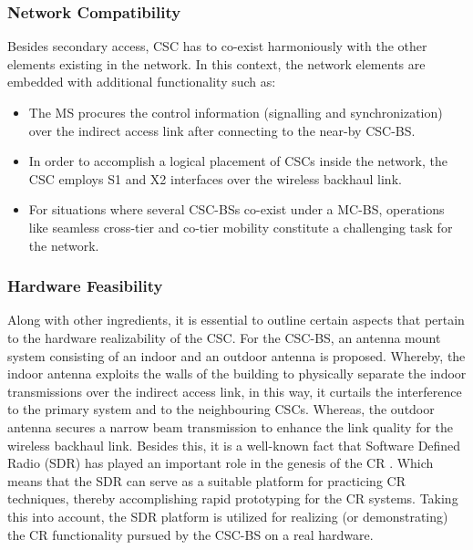 \subsubsection*{Network Compatibility}
Besides secondary access, CSC has to co-exist harmoniously with the other elements existing in the network. In this context, the network elements are embedded with additional functionality such as:
\begin{itemize}
\item The MS procures the control information (signalling and synchronization) over the indirect access link after connecting to the near-by CSC-BS.
\item In order to accomplish a logical placement of CSCs inside the network, the CSC employs S1 and X2 interfaces over the wireless backhaul link.
\item For situations where several CSC-BSs co-exist under a MC-BS, operations like seamless cross-tier and co-tier mobility constitute a challenging task for the network.
\end{itemize}


\subsubsection*{Hardware Feasibility}
Along with other ingredients, it is essential to outline certain aspects that pertain to the hardware realizability of the CSC. For the CSC-BS, an antenna mount system consisting of an indoor and an outdoor antenna is proposed. Whereby, the indoor antenna exploits the walls of the building to physically separate the indoor transmissions over the indirect access link, in this way, it curtails the interference to the primary system and to the neighbouring CSCs. Whereas, the outdoor antenna secures a narrow beam transmission to enhance the link quality for the wireless backhaul link. Besides this, it is a well-known fact that Software Defined Radio (SDR) has played an important role in the genesis of the CR \cite{Jondral05}. Which means that the SDR can serve as a suitable platform for practicing CR techniques, thereby accomplishing rapid prototyping for the CR systems. Taking this into account, the SDR platform is utilized for realizing (or demonstrating) the CR functionality pursued by the CSC-BS on a real hardware.


